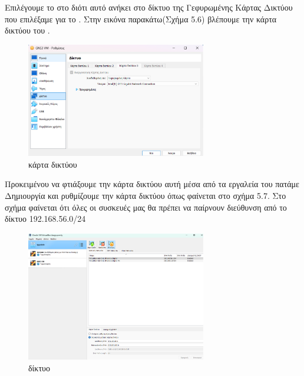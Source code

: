 Επιλέγουμε το  στο  διότι αυτό ανήκει στο δίκτυο της Γεφυρωμένης Κάρτας Δικτύου που επιλέξαμε για το . Στην εικόνα παρακάτω(Σχήμα 5.6) βλέπουμε την κάρτα δικτύου του .

\FloatBarrier

\begin{figure}[htb]
	\centering
	\includegraphics[width=0.7\textwidth]{graphics/GNS3_network_adapter.png}
	\caption{ κάρτα δικτύου }
\end{figure}

\FloatBarrier

Προκειμένου να φτιάξουμε την κάρτα δικτύου αυτή μέσα από τα εργαλεία του  πατάμε Δημιουργία 
και ρυθμίζουμε την κάρτα δικτύου όπως φαίνεται στο σχήμα 5.7. Στο σχήμα φαίνεται ότι όλες οι συσκευές μας θα πρέπει να παίρνουν  διεύθυνση από το δίκτυο 192.168.56.0/24


\FloatBarrier

\begin{figure}[htb]
	\centering
	\includegraphics[width=0.7\textwidth]{graphics/GNS3_Network.png}
	\caption{ δίκτυο }
\end{figure}

\FloatBarrier


